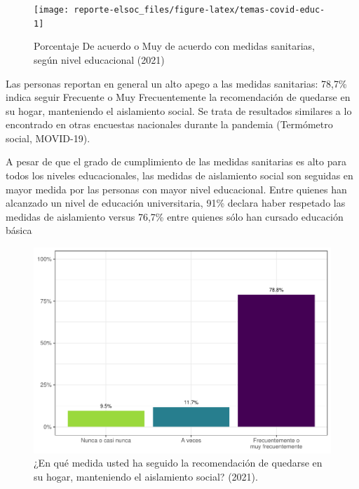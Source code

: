 \documentclass[
  12pt,
]{book}
\begin{document}
\begin{figure}

{\centering \texttt{[image: reporte-elsoc\_files/figure-latex/temas-covid-educ-1]} 

}

\caption{Porcentaje De acuerdo o Muy de acuerdo con medidas sanitarias, según nivel educacional (2021)}\label{fig:temas-covid-educ}
\end{figure}

Las personas reportan en general un alto apego a las medidas sanitarias: 78,7\% indica seguir Frecuente o Muy Frecuentemente la recomendación de quedarse en su hogar, manteniendo el aislamiento social. Se trata de resultados similares a lo encontrado en otras encuestas nacionales durante la pandemia (Termómetro social, MOVID-19).

A pesar de que el grado de cumplimiento de las medidas sanitarias es alto para todos los niveles educacionales, las medidas de aislamiento social son seguidas en mayor medida por las personas con mayor nivel educacional. Entre quienes han alcanzado un nivel de educación universitaria, 91\% declara haber respetado las medidas de aislamiento versus 76,7\% entre quienes sólo han cursado educación básica

\begin{figure}

{\centering \includegraphics{reporte-elsoc_files/figure-latex/dist-total-1} 

}

\caption{¿En qué medida usted ha seguido la recomendación de quedarse en su hogar, manteniendo el aislamiento social? (2021).}\label{fig:dist-total}
\end{figure}
\end{document}
